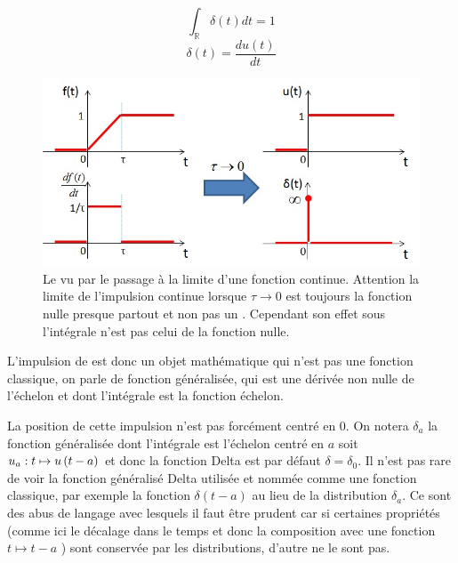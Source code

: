 \begin{remark}{}
        \begin{figure}[htbp]
          \begin{minipage}[l]{0.4\linewidth}
          \begin{equation}\label{Dirac_aire}
            \int_{\mathbb{R}}\delta (t)dt = 1 	
          \end{equation}
	\begin{equation}\label{Dirac_derive}
          \delta (t) = \frac{du(t)}{dt}	 	
	\end{equation}
	\end{minipage} \hfill
	\begin{minipage}[r]{0.6\linewidth}
          \includegraphics[scale=0.5]{images/generation_Dirac.jpg}
   	\end{minipage}
	\vspace{0.5\baselineskip}
        
        \caption{Le \Dirac{} vu par le passage à la limite d'une
          fonction continue. Attention la limite de l'impulsion
          continue lorsque $\tau\to 0$ est toujours la fonction
          nulle presque partout et non pas un \Dirac{}. Cependant son
          effet sous l'intégrale n'est pas celui de la fonction
          nulle.}
        \label{fig:dirac}
      \end{figure}
	L'impulsion de \Dirac{} est donc un objet mathématique qui
        n'est pas une fonction classique, on parle de fonction
        généralisée, qui est une dérivée non nulle de l'échelon et
        dont l'intégrale est la fonction échelon. 

        La position de cette impulsion n'est pas forcément centré en
        0. On notera $\delta_a$ la fonction généralisée dont
        l'intégrale est l'échelon centré en $a$ soit
        $u_a : t\mapsto u\left(t-a\right)$ et donc la fonction Delta est par
      défaut $\delta = \delta_0$. Il n'est pas rare de voir la
      fonction généralisé Delta utilisée et nommée comme une fonction
      classique, par exemple \og{} la fonction $\delta(t-a)$ \fg{} au
      lieu de la distribution $\delta_a$. Ce sont des abus de langage
      avec lesquels il faut être prudent car si certaines propriétés
      (comme ici le décalage dans le temps et donc la composition avec
      une fonction $t\mapsto t-a$ ) sont conservée par les
      distributions, d'autre ne le sont pas.
        

\end{remark}

